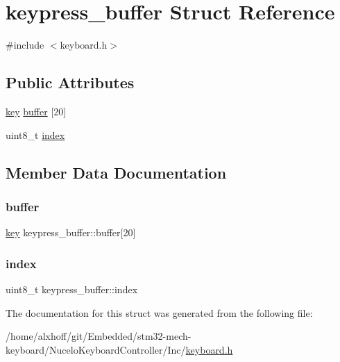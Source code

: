\hypertarget{structkeypress__buffer}{}\section{keypress\+\_\+buffer Struct Reference}
\label{structkeypress__buffer}


{\ttfamily \#include $<$keyboard.\+h$>$}

\subsection*{Public Attributes}
\begin{DoxyCompactItemize}
\item 
\hyperlink{structkey}{key} \hyperlink{structkeypress__buffer_abeb0c8921d058d71e557dff4e64a7e9e}{buffer} \mbox{[}20\mbox{]}
\item 
uint8\+\_\+t \hyperlink{structkeypress__buffer_aa65a87852d890d7f8068122b36205e2d}{index}
\end{DoxyCompactItemize}


\subsection{Member Data Documentation}
\mbox{\label{structkeypress__buffer_abeb0c8921d058d71e557dff4e64a7e9e}} 
\subsubsection{\texorpdfstring{buffer}{buffer}}
{\footnotesize\ttfamily \hyperlink{structkey}{key} keypress\+\_\+buffer\+::buffer\mbox{[}20\mbox{]}}

\mbox{\label{structkeypress__buffer_aa65a87852d890d7f8068122b36205e2d}} 
\subsubsection{\texorpdfstring{index}{index}}
{\footnotesize\ttfamily uint8\+\_\+t keypress\+\_\+buffer\+::index}



The documentation for this struct was generated from the following file\+:\begin{DoxyCompactItemize}
\item 
/home/alxhoff/git/\+Embedded/stm32-\/mech-\/keyboard/\+Nucelo\+Keyboard\+Controller/\+Inc/\hyperlink{keyboard_8h}{keyboard.\+h}\end{DoxyCompactItemize}
